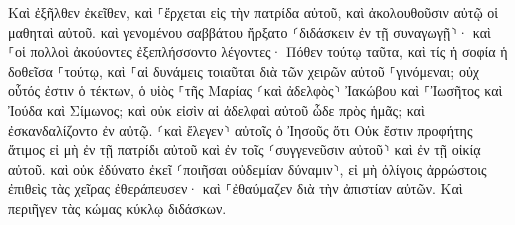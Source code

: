\documentclass{openreader}
\begin{document}
Καὶ ἐξῆλθεν ἐκεῖθεν, καὶ ⸀ἔρχεται εἰς τὴν πατρίδα αὐτοῦ, καὶ ἀκολουθοῦσιν αὐτῷ οἱ μαθηταὶ αὐτοῦ. 
καὶ γενομένου σαββάτου ἤρξατο ⸂διδάσκειν ἐν τῇ συναγωγῇ⸃· καὶ ⸀οἱ πολλοὶ ἀκούοντες ἐξεπλήσσοντο λέγοντες· Πόθεν τούτῳ ταῦτα, καὶ τίς ἡ σοφία ἡ δοθεῖσα ⸀τούτῳ, καὶ ⸀αἱ δυνάμεις τοιαῦται διὰ τῶν χειρῶν αὐτοῦ ⸀γινόμεναι; 
οὐχ οὗτός ἐστιν ὁ τέκτων, ὁ υἱὸς ⸀τῆς Μαρίας ⸂καὶ ἀδελφὸς⸃ Ἰακώβου καὶ ⸀Ἰωσῆτος καὶ Ἰούδα καὶ Σίμωνος; καὶ οὐκ εἰσὶν αἱ ἀδελφαὶ αὐτοῦ ὧδε πρὸς ἡμᾶς; καὶ ἐσκανδαλίζοντο ἐν αὐτῷ. 
⸂καὶ ἔλεγεν⸃ αὐτοῖς ὁ Ἰησοῦς ὅτι Οὐκ ἔστιν προφήτης ἄτιμος εἰ μὴ ἐν τῇ πατρίδι αὐτοῦ καὶ ἐν τοῖς ⸂συγγενεῦσιν αὐτοῦ⸃ καὶ ἐν τῇ οἰκίᾳ αὐτοῦ. 
καὶ οὐκ ἐδύνατο ἐκεῖ ⸂ποιῆσαι οὐδεμίαν δύναμιν⸃, εἰ μὴ ὀλίγοις ἀρρώστοις ἐπιθεὶς τὰς χεῖρας ἐθεράπευσεν· 
καὶ ⸀ἐθαύμαζεν διὰ τὴν ἀπιστίαν αὐτῶν. Καὶ περιῆγεν τὰς κώμας κύκλῳ διδάσκων. 
\end{document}
